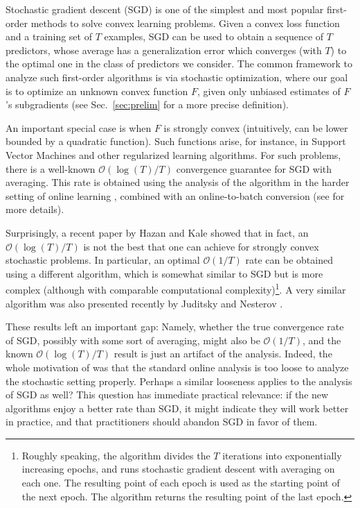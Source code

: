 \documentclass{article}
\newcommand{\Ocal}{\mathcal{O}}
\newcommand{\secref}[1]{Sec.~\ref{#1}}
\begin{document}
Stochastic gradient descent (SGD) is one of the simplest and most popular first-order methods to solve convex learning problems. Given a convex loss function and a training set of $T$ examples, SGD can be used to obtain a sequence of $T$ predictors, whose average has a generalization error which converges (with $T$) to the optimal one in the class of predictors we consider. The common framework to analyze such first-order algorithms is via stochastic optimization, where our goal is to optimize an unknown convex function $F$, given only unbiased estimates of $F$'s subgradients (see \secref{sec:prelim} for a more precise definition).

An important special case is when $F$ is strongly convex (intuitively, can be lower bounded by a quadratic function). Such functions arise, for instance, in Support Vector Machines and other regularized learning algorithms. For such problems, there is a well-known $\Ocal(\log(T)/T)$ convergence guarantee for SGD with averaging. This rate is obtained using the analysis of the algorithm in the harder setting of online learning \cite{HazAgKal07}, combined with an online-to-batch conversion (see \cite{HazanKa11} for more details).

Surprisingly, a recent paper by Hazan and Kale \cite{HazanKa11} showed that in fact, an $\Ocal(\log(T)/T)$ is not the best that one can achieve for strongly convex stochastic problems. In particular, an optimal $\Ocal(1/T)$ rate can be obtained using a different algorithm, which is somewhat similar to SGD but is more complex (although with comparable computational complexity)\footnote{Roughly speaking, the algorithm divides the $T$ iterations into exponentially increasing epochs, and runs stochastic gradient descent with averaging on each one. The resulting point of each epoch is used as the starting point of the next epoch. The algorithm returns the resulting point of the last epoch.}. A very similar algorithm was also presented recently by Juditsky and Nesterov \cite{JudNes11}.

These results left an important gap: Namely, whether the true convergence rate of SGD, possibly with some sort of averaging, might also be $\Ocal(1/T)$, and the known $\Ocal(\log(T)/T)$ result is just an artifact of the analysis. Indeed, the whole motivation of \cite{HazanKa11} was that the standard online analysis is too loose to analyze the stochastic setting properly. Perhaps a similar looseness applies to the analysis of SGD as well? This question has immediate practical relevance: if the new algorithms enjoy a better rate than SGD, it might indicate they will work better in practice, and that practitioners should abandon SGD in favor of them.
\end{document}
